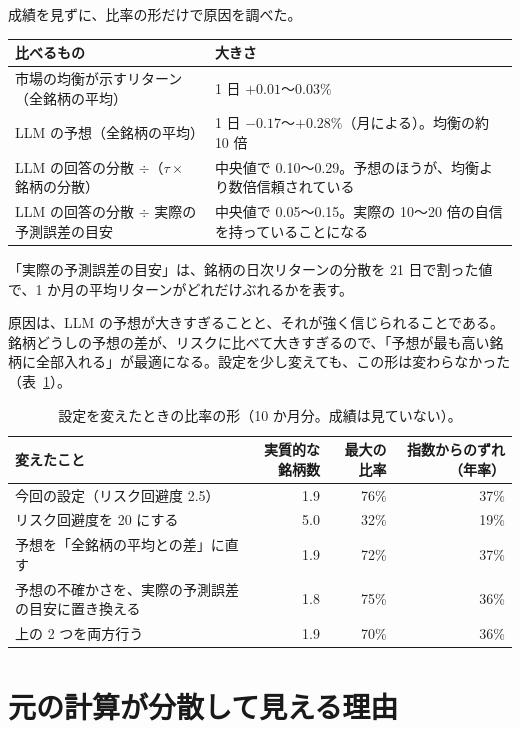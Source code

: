 \documentclass[xelatex,ja=standard,jafont=hiragino-pron,a4paper,10pt]{bxjsreport}
\newcommand{\tabref}[1]{表~\ref{#1}}
\begin{document}
成績を見ずに、比率の形だけで原因を調べた。

\begin{longtable}{p{8.20cm}p{6.20cm}}
\toprule
\textbf{比べるもの} & \textbf{大きさ} \\
\midrule
\endfirsthead
\bottomrule
\endfoot
市場の均衡が示すリターン（全銘柄の平均） & 1 日 $+0.01$〜$0.03\%$ \\
LLM の予想（全銘柄の平均） & 1 日 $-0.17$〜$+0.28\%$（月による）。均衡の約 10 倍 \\
LLM の回答の分散 $\div$（$\tau \times$ 銘柄の分散） & 中央値で 0.10〜0.29。予想のほうが、均衡より数倍信頼されている \\
LLM の回答の分散 $\div$ 実際の予測誤差の目安 & 中央値で 0.05〜0.15。実際の 10〜20 倍の自信を持っていることになる \\
\end{longtable}

「実際の予測誤差の目安」は、銘柄の日次リターンの分散を 21 日で割った値で、1 か月の平均リターンがどれだけぶれるかを表す。

原因は、LLM の予想が大きすぎることと、それが強く信じられることである。銘柄どうしの予想の差が、リスクに比べて大きすぎるので、「予想が最も高い銘柄に全部入れる」が最適になる。設定を少し変えても、この形は変わらなかった（\tabref{tab:tryset}）。

\begin{table}[htbp]
\centering
\caption{設定を変えたときの比率の形（10 か月分。成績は見ていない）。}
\label{tab:tryset}
\small
\begin{tabular}{p{7.00cm}rrr}
\toprule
変えたこと & 実質的な銘柄数 & 最大の比率 & 指数からのずれ（年率） \\
\midrule
今回の設定（リスク回避度 2.5） & 1.9 & 76\% & 37\% \\
リスク回避度を 20 にする & 5.0 & 32\% & 19\% \\
予想を「全銘柄の平均との差」に直す & 1.9 & 72\% & 37\% \\
予想の不確かさを、実際の予測誤差の目安に置き換える & 1.8 & 75\% & 36\% \\
上の 2 つを両方行う & 1.9 & 70\% & 36\% \\
\bottomrule
\end{tabular}
\end{table}

\section{元の計算が分散して見える理由}
\end{document}
